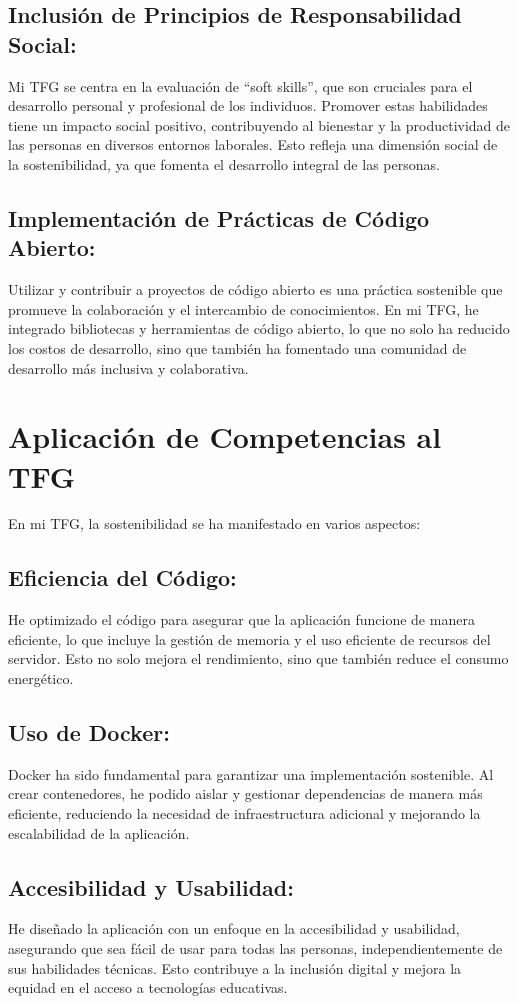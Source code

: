 \subsection{Inclusión de Principios de Responsabilidad Social:}
Mi TFG se centra en la evaluación de ``soft skills'', que son cruciales para el desarrollo personal y profesional de los individuos. Promover estas habilidades tiene un impacto social positivo, contribuyendo al bienestar y la productividad de las personas en diversos entornos laborales. Esto refleja una dimensión social de la sostenibilidad, ya que fomenta el desarrollo integral de las personas.

\subsection{Implementación de Prácticas de Código Abierto:}
Utilizar y contribuir a proyectos de código abierto es una práctica sostenible que promueve la colaboración y el intercambio de conocimientos. En mi TFG, he integrado bibliotecas y herramientas de código abierto, lo que no solo ha reducido los costos de desarrollo, sino que también ha fomentado una comunidad de desarrollo más inclusiva y colaborativa.

\section{Aplicación de Competencias al TFG}
En mi TFG, la sostenibilidad se ha manifestado en varios aspectos:

\subsection{Eficiencia del Código:}
He optimizado el código para asegurar que la aplicación funcione de manera eficiente, lo que incluye la gestión de memoria y el uso eficiente de recursos del servidor. Esto no solo mejora el rendimiento, sino que también reduce el consumo energético.

\subsection{Uso de Docker:}
Docker ha sido fundamental para garantizar una implementación sostenible. Al crear contenedores, he podido aislar y gestionar dependencias de manera más eficiente, reduciendo la necesidad de infraestructura adicional y mejorando la escalabilidad de la aplicación.

\subsection{Accesibilidad y Usabilidad:}
He diseñado la aplicación con un enfoque en la accesibilidad y usabilidad, asegurando que sea fácil de usar para todas las personas, independientemente de sus habilidades técnicas. Esto contribuye a la inclusión digital y mejora la equidad en el acceso a tecnologías educativas.

